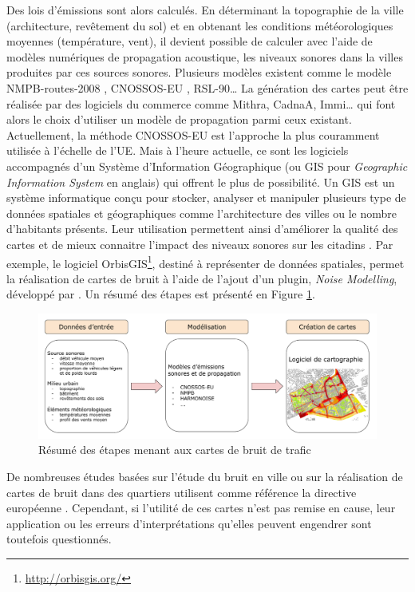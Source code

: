 Des lois d'émissions sont alors calculés. En déterminant la topographie de la ville (architecture, revêtement du sol) et en obtenant les conditions météorologiques moyennes (température, vent), il devient possible de calculer avec l'aide de modèles numériques de propagation acoustique, les niveaux sonores dans la villes produites par ces sources sonores. Plusieurs modèles existent comme le modèle NMPB-routes-2008 \cite{setra_prevision_2009-1, setra_prevision_2009-2},  CNOSSOS-EU \cite{CNOSSOS}, RSL-90\dots{} La génération des cartes peut être réalisée par des logiciels du commerce comme Mithra, CadnaA, Immi\dots{} qui font alors le choix d'utiliser un modèle de propagation parmi ceux existant. Actuellement, la méthode CNOSSOS-EU est l'approche la plus couramment utilisée à l'échelle de l'UE. Mais à l'heure actuelle, ce sont les logiciels accompagnés d'un Système d'Information Géographique (ou GIS pour \textit{Geographic Information System} en anglais) qui offrent le plus de possibilité. Un GIS est un système informatique conçu pour stocker, analyser et manipuler plusieurs type de données spatiales et géographiques comme l'architecture des villes ou le nombre d'habitants présents. Leur utilisation permettent ainsi d'améliorer la qualité des cartes et de mieux connaitre l'impact des niveaux sonores sur les citadins \cite{murphy2011scenario}. Par exemple, le logiciel OrbisGIS\footnote{\url{http://orbisgis.org/}}, destiné à représenter de données spatiales, permet la réalisation de cartes de bruit à l'aide de l'ajout d'un plugin, \textit{Noise Modelling}, développé par \cite{fortin:hal-00845701}. Un résumé des étapes est présenté en Figure \ref{fig:cartographie}.\\

\begin{figure}[t]
\centering
\includegraphics[width=.85\linewidth]{./figures/cartographie/cartographie.pdf}
\caption{Résumé des étapes menant aux cartes de bruit de trafic}
\label{fig:cartographie}
\end{figure}


De nombreuses études basées sur l'étude du bruit en ville ou sur la réalisation de cartes de bruit dans des quartiers utilisent comme référence la directive européenne \cite{murphy_environmental_2006, murphy_estimating_2009, Eriksson_residential_2013}. Cependant, si l'utilité de ces cartes n'est pas remise en cause, leur application ou les erreurs d'interprétations qu'elles peuvent engendrer sont toutefois questionnés.  

